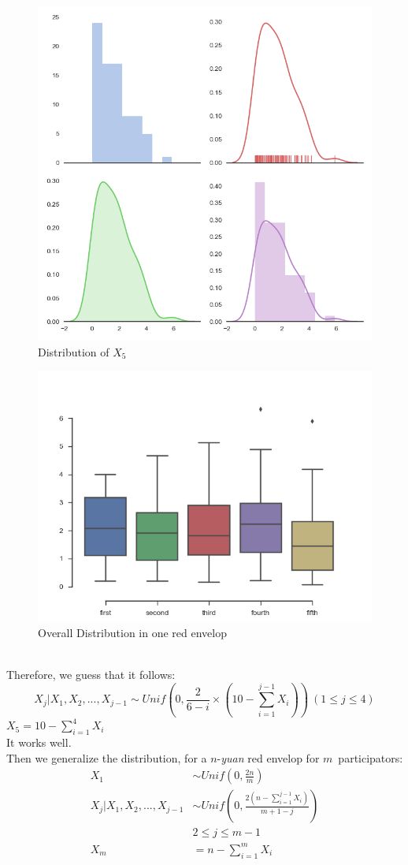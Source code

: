\documentclass[10pt,journal]{IEEEtran}
\begin{document}
\begin{figure}[!ht]
\centering
\includegraphics[width=0.7\columnwidth,height=0.6\linewidth]{10_5.png}
\caption{Distribution of \(X_5\)}
\end{figure}
\begin{figure}[!ht]
	\centering
	\includegraphics[width=0.7\columnwidth,height=0.6\linewidth]{10_Overall.png}
	\caption{Overall Distribution in one red envelop}
\end{figure}
\\
Therefore, we guess that it follows:
\begin{displaymath}
X_j|X_1,X_2,...,X_{j-1}\sim Unif(0,\frac{2}{6-i}\times(10-\sum_{i=1}^{j-1}X_i))\ (1\leq j\leq 4)
\end{displaymath}
\(X_5=10-\sum_{i=1}^{4}X_i\)
\\
It works well.
\\
Then we generalize the distribution, for a \(n\)-\emph{yuan} red envelop for \(m\)\ participators:
\[
	\begin{split}
		X_1&\sim Unif(0,\frac{2n}{m})
		\\
		X_j|X_1,X_2,...,X_{j-1}&\sim Unif(0,\frac{2(n-\sum_{i=1}^{j-1}X_i)}{m+1-j})
		\\
		&2\leq j\leq m-1
		\\
		X_m&=n-\sum_{i=1}^{m}X_i
	\end{split}
\]
\end{document}
